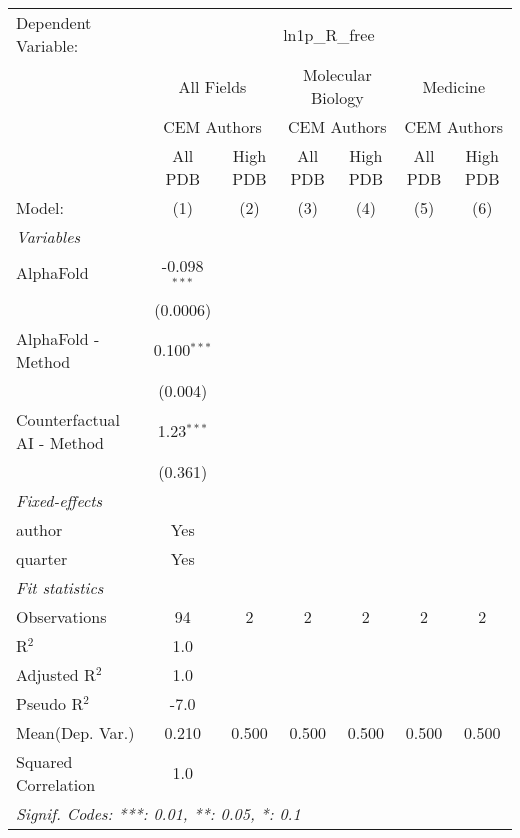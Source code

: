 \begingroup
\centering
\begin{tabular}{lcccccc}
   \tabularnewline \midrule \midrule
   Dependent Variable: & \multicolumn{6}{c}{ln1p\_R\_free}\\
 & \multicolumn{2}{c}{All Fields} & \multicolumn{2}{c}{Molecular Biology} & \multicolumn{2}{c}{Medicine} \\
\cmidrule(lr){2-3} \cmidrule(lr){4-5} \cmidrule(lr){6-7}
 & \multicolumn{2}{c}{CEM Authors} & \multicolumn{2}{c}{CEM Authors} & \multicolumn{2}{c}{CEM Authors} \\
\cmidrule(lr){2-3} \cmidrule(lr){4-5} \cmidrule(lr){6-7}
 & \multicolumn{1}{c}{All PDB} & \multicolumn{1}{c}{High PDB} & \multicolumn{1}{c}{All PDB} & \multicolumn{1}{c}{High PDB} & \multicolumn{1}{c}{All PDB} & \multicolumn{1}{c}{High PDB} \\
\cmidrule(lr){2-2} \cmidrule(lr){3-3} \cmidrule(lr){4-4} \cmidrule(lr){5-5} \cmidrule(lr){6-6} \cmidrule(lr){7-7}
   Model:                     & (1)            & (2) & (3) & (4) & (5) & (6)\\  
   \midrule
   \emph{Variables}\\
   AlphaFold                  & -0.098$^{***}$ &     &     &     &     &   \\   
                              & (0.0006)       &     &     &     &     &   \\   
   AlphaFold - Method         & 0.100$^{***}$  &     &     &     &     &   \\   
                              & (0.004)        &     &     &     &     &   \\   
   Counterfactual AI - Method & 1.23$^{***}$   &     &     &     &     &   \\   
                              & (0.361)        &     &     &     &     &   \\   
   \midrule
   \emph{Fixed-effects}\\
   author                     & Yes            &     &     &     &     & \\  
   quarter                    & Yes            &     &     &     &     & \\  
   \midrule
   \emph{Fit statistics}\\
   Observations               & 94             & 2   & 2   & 2   & 2   & 2\\  
   R$^2$                      & 1.0            &     &     &     &     & \\  
   Adjusted R$^2$             & 1.0            &     &     &     &     & \\  
   Pseudo R$^2$               & -7.0           &     &     &     &     & \\  
Mean(Dep. Var.) & 0.210 & 0.500 & 0.500 & 0.500 & 0.500 & 0.500 \\
   Squared Correlation        & 1.0            &     &     &     &     & \\  
   \midrule \midrule
   \multicolumn{7}{l}{\emph{Signif. Codes: ***: 0.01, **: 0.05, *: 0.1}}\\
\end{tabular}
\par\endgroup
